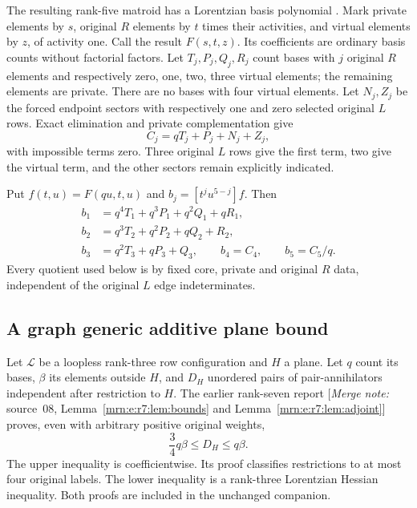\documentclass[11pt,a4paper]{article}
\theoremstyle{remark}\newtheorem{remark}[theorem]{Remark}
\newcommand{\mnote}[1]{[\textit{Merge note:} #1]}
\begin{document}
The resulting rank-five matroid has a Lorentzian basis polynomial \cite{b:BH}. Mark private elements by $s$, original $R$ elements by $t$ times their activities, and virtual elements by $z$, of activity one. Call the result $F(s,t,z)$. Its coefficients are ordinary basis counts without factorial factors. Let $T_j,P_j,Q_j,R_j$ count bases with $j$ original $R$ elements and respectively zero, one, two, three virtual elements; the remaining elements are private. There are no bases with four virtual elements. Let $N_j,Z_j$ be the forced endpoint sectors with respectively one and zero selected original $L$ rows. Exact elimination and private complementation give
\begin{equation}\label{mrn:e:fp:eq:sectors}
 C_j=qT_j+P_j+N_j+Z_j,
\end{equation}
with impossible terms zero. Three original $L$ rows give the first term, two give the virtual term, and the other sectors remain explicitly indicated.

Put $f(t,u)=F(qu,t,u)$ and $b_j=[t^ju^{5-j}]f$. Then
\begin{equation}\label{mrn:e:fp:eq:bj}
 \begin{aligned}
 b_1&=q^4T_1+q^3P_1+q^2Q_1+qR_1,\\
 b_2&=q^3T_2+q^2P_2+qQ_2+R_2,\\
 b_3&=q^2T_3+qP_3+Q_3,\qquad
 b_4=C_4,\qquad b_5=C_5/q.
 \end{aligned}
\end{equation}
Every quotient used below is by fixed core, private and original $R$ data, independent of the original $L$ edge indeterminates.

\subsection{A graph generic additive plane bound}
Let $\mathcal L$ be a loopless rank-three row configuration and $H$ a plane. Let $q$ count its bases, $\beta$ its elements outside $H$, and $D_H$ unordered pairs of pair-annihilators independent after restriction to $H$. The earlier rank-seven report \mnote{source~08, Lemma~\ref{mrn:e:r7:lem:bounds} and Lemma~\ref{mrn:e:r7:lem:adjoint}} \cite{b:m08} proves, even with arbitrary positive original weights,
\begin{equation}\label{mrn:e:fp:eq:old}
 \frac34q\beta\le D_H\le q\beta.
\end{equation}
The upper inequality is coefficientwise. Its proof classifies restrictions to at most four original labels. The lower inequality is a rank-three Lorentzian Hessian inequality. Both proofs are included in the unchanged companion.
\end{document}

